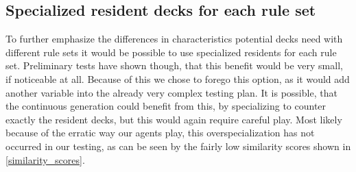 \subsection{Specialized resident decks for each rule set}
\label{sec:method:testing:special}
To further emphasize the differences in characteristics potential decks need with different rule sets it would be possible to use specialized residents for each rule set. Preliminary tests have shown though, that this benefit would be very small, if noticeable at all. Because of this we chose to forego this option, as it would add another variable into the already very complex testing plan. It is possible, that the continuous generation could benefit from this, by specializing to counter exactly the resident decks, but this would again require careful play. Most likely because of the erratic way our agents play, this overspecialization has not occurred in our testing, as can be seen by the fairly low similarity scores shown in \ref{similarity_scores}.




